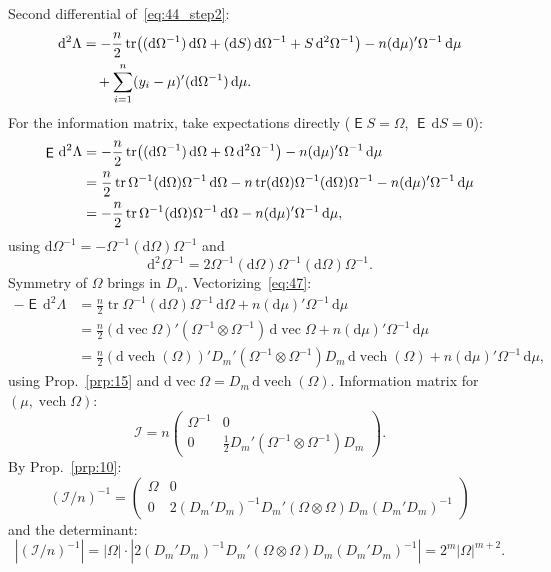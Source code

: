 \documentclass[14pt]{extarticle}
\theoremstyle{plain}
\theoremstyle{definition}
\theoremstyle{remark}
\DeclareMathOperator\expc{\mathsf{E}}
\DeclareMathOperator{\tr}{tr}
\DeclareMathOperator{\vech}{vech}
\DeclareMathOperator{\avec}{vec}
\newcommand{\dd}{\mathrm{d}}
\begin{document}
Second differential of~\eqref{eq:44_step2}:
\begin{align}\label{eq:46}
\dd^2\Lambda &= -\frac{n}{2}\tr\bigl((\dd\Omega^{-1})\, \dd\Omega + (\dd S)\, \dd\Omega^{-1} + S\, \dd^2\Omega^{-1}\bigr) - n(\dd\mu)'\Omega^{-1}\, \dd\mu \notag \\
&\quad + \sum_{i=1}^{n}(y_i - \mu)'(\dd\Omega^{-1})\, \dd\mu.
\end{align}
For the information matrix, take expectations directly ($\expc S = \Omega$, $\expc\,\dd S = 0$):
\begin{align}\label{eq:47}
\expc\, \dd^2\Lambda &= -\frac{n}{2}\tr\bigl((\dd\Omega^{-1})\, \dd\Omega + \Omega\, \dd^2\Omega^{-1}\bigr) - n(\dd\mu)'\Omega^{-1}\, \dd\mu \notag \\
&= \frac{n}{2}\tr\Omega^{-1}(\dd\Omega)\Omega^{-1}\, \dd\Omega - n\tr(\dd\Omega)\Omega^{-1}(\dd\Omega)\Omega^{-1} - n(\dd\mu)'\Omega^{-1}\, \dd\mu \notag \\
&= -\frac{n}{2}\tr\Omega^{-1}(\dd\Omega)\Omega^{-1}\, \dd\Omega - n(\dd\mu)'\Omega^{-1}\, \dd\mu,
\end{align}
using $\dd\Omega^{-1} = -\Omega^{-1}(\dd\Omega)\Omega^{-1}$ and
\[
\dd^2\Omega^{-1} = 2\Omega^{-1}(\dd\Omega)\Omega^{-1}(\dd\Omega)\Omega^{-1}.
\]
Symmetry of $\Omega$ brings in $D_n$. Vectorizing~\eqref{eq:47}:
\begin{align*}
-\expc\, \dd^2\Lambda &= \frac{n}{2}\tr\Omega^{-1}(\dd\Omega)\Omega^{-1}\, \dd\Omega + n(\dd\mu)'\Omega^{-1}\, \dd\mu \\
&= \frac{n}{2}(\dd\avec\Omega)'(\Omega^{-1} \otimes \Omega^{-1})\, \dd\avec\Omega + n(\dd\mu)'\Omega^{-1}\, \dd\mu \\
&= \frac{n}{2}(\dd\vech(\Omega))' D_m'(\Omega^{-1} \otimes \Omega^{-1})D_m\, \dd\vech(\Omega) + n(\dd\mu)'\Omega^{-1}\, \dd\mu,
\end{align*}
using Prop.~\ref{prp:15} and $\dd\avec\Omega = D_m\,\dd\vech(\Omega)$. Information matrix for $(\mu, \vech\Omega)$:
\begin{equation}\label{eq:48}
\mathcal{I} = n \begin{pmatrix} \Omega^{-1} & 0 \\ 0 & \tfrac{1}{2}D_m'(\Omega^{-1} \otimes \Omega^{-1})D_m \end{pmatrix}.
\end{equation}
By Prop.~\ref{prp:10}:
\[
(\mathcal{I}/n)^{-1} = \begin{pmatrix} \Omega & 0 \\ 0 & 2(D_m'D_m)^{-1}D_m'(\Omega \otimes \Omega)D_m(D_m'D_m)^{-1} \end{pmatrix}
\]
and the determinant:
\[
|(\mathcal{I}/n)^{-1}| = |\Omega| \cdot |2(D_m'D_m)^{-1}D_m'(\Omega \otimes \Omega)D_m(D_m'D_m)^{-1}| = 2^m |\Omega|^{m+2}.
\]
\end{document}
